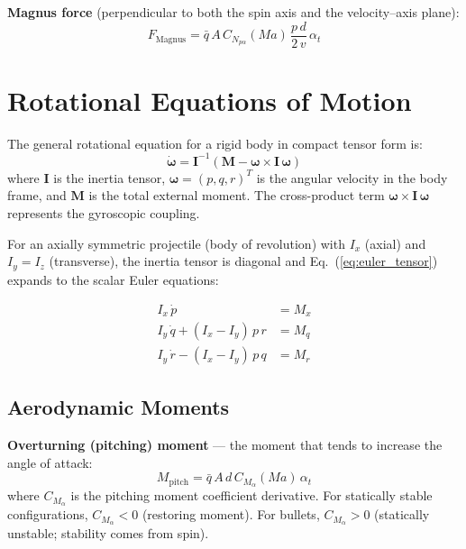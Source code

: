 \documentclass[11pt,twoside,openright]{report}
\newcommand{\Mach}{\mathit{Ma}}
\begin{document}
\textbf{Magnus force} (perpendicular to both the spin axis and the velocity--axis plane):
\begin{equation}
  F_{\mathrm{Magnus}} = \bar{q}\,A\,C_{N_{p\alpha}}(\Mach)\,\frac{p\,d}{2\,v}\,\alpha_t
  \label{eq:6dof_magnus_force}
\end{equation}

\section{Rotational Equations of Motion}

The general rotational equation for a rigid body in compact tensor form is:
\begin{equation}
  \boxed{\dot{\bm{\omega}} = \bm{I}^{-1}\!\left(\bm{M} - \bm{\omega} \times \bm{I}\,\bm{\omega}\right)}
  \label{eq:euler_tensor}
\end{equation}
where $\bm{I}$ is the inertia tensor, $\bm{\omega} = (p, q, r)^T$ is the angular velocity in the body frame, and $\bm{M}$ is the total external moment. The cross-product term $\bm{\omega} \times \bm{I}\,\bm{\omega}$ represents the gyroscopic coupling.

For an axially symmetric projectile (body of revolution) with $I_x$ (axial) and $I_y = I_z$ (transverse), the inertia tensor is diagonal and Eq.~(\ref{eq:euler_tensor}) expands to the scalar Euler equations:

\begin{align}
  I_x\,\dot{p} &= M_x \label{eq:euler_p}\\
  I_y\,\dot{q} + (I_x - I_y)\,p\,r &= M_q \label{eq:euler_q}\\
  I_y\,\dot{r} - (I_x - I_y)\,p\,q &= M_r \label{eq:euler_r}
\end{align}

\subsection{Aerodynamic Moments}

\textbf{Overturning (pitching) moment} --- the moment that tends to increase the angle of attack:
\begin{equation}
  M_{\mathrm{pitch}} = \bar{q}\,A\,d\,C_{M_\alpha}(\Mach)\,\alpha_t
  \label{eq:overturning_moment}
\end{equation}
where $C_{M_\alpha}$ is the pitching moment coefficient derivative. For statically stable configurations, $C_{M_\alpha} < 0$ (restoring moment). For bullets, $C_{M_\alpha} > 0$ (statically unstable; stability comes from spin).
\end{document}
